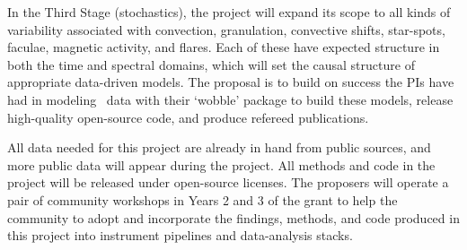 \documentclass[12pt, fullpage, letterpaper]{article}
\begin{document}
In the Third Stage (stochastics), the project will expand its scope to
all kinds of variability associated with convection, granulation,
convective shifts, star-spots, faculae, magnetic activity, and
flares. Each of these have expected structure in both the time and
spectral domains, which will set the causal structure of appropriate
data-driven models. The proposal is to build on success the PIs have
had in modeling \RV\ data with their ‘wobble’ package to build these
models, release high-quality open-source code, and produce refereed
publications.

All data needed for this project are already in hand from public
sources, and more public data will appear during the project. All
methods and code in the project will be released under open-source
licenses. The proposers will operate a pair of community workshops in
Years 2 and 3 of the grant to help the community to adopt and
incorporate the findings, methods, and code produced in this project
into instrument pipelines and data-analysis stacks.
\end{document}
